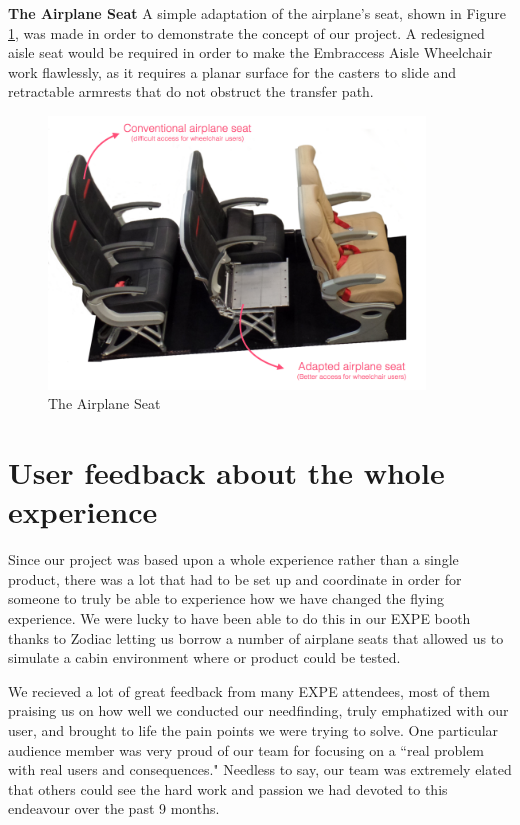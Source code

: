 \textbf{The Airplane Seat}
	A simple adaptation of the airplane's seat, shown in Figure \ref{fig:airplane}, was made in order to demonstrate the concept of our project. A redesigned aisle seat would be required in order to make the Embraccess Aisle Wheelchair work flawlessly, as it requires a planar surface for the casters to slide and retractable armrests that do not obstruct the transfer path.

\begin{figure}[h]
\centering
\includegraphics[width=10cm]{images/AisleWheelchair9.png}
\caption{The Airplane Seat}
\label{fig:airplane}
\end{figure}

\newpage

\section{User feedback about the whole experience}

Since our project was based upon a whole experience rather than a single product, there was a lot that had to be set up and coordinate in order for someone to truly be able to experience how we have changed the flying experience. We were lucky to have been able to do this in our EXPE booth thanks to Zodiac letting us borrow a number of airplane seats that allowed us to simulate a cabin environment where or product could be tested. 


	We recieved a lot of great feedback from many EXPE attendees, most of them praising us on how well we conducted our needfinding, truly emphatized with our user, and brought to life the pain points we were trying to solve. One particular audience member was very proud of our team for focusing on a ``real problem with real users and consequences." Needless to say, our team was extremely elated that others could see the hard work and passion we had devoted to this endeavour over the past 9 months.  

